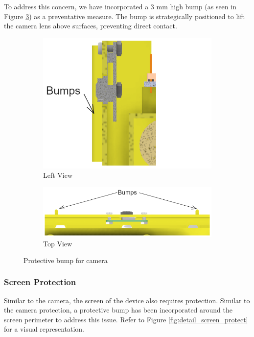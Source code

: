 To address this concern, we have incorporated a 3 mm high bump (as seen in Figure \ref{fig:detail_camera_protect}) as a preventative measure. The bump is strategically positioned to lift the camera lens above surfaces, preventing direct contact.

\begin{figure}[!ht]
    \centering
    \begin{subfigure}[c]{0.47\textwidth}
        \begin{minipage}{\textwidth}
            \centering
            \includegraphics[height=4 cm]{texs/Part1/chapter4/image/d12.png}
        \end{minipage}
        \caption{Left View}
        \label{fig:detail_camera_left}
    \end{subfigure}
    \begin{subfigure}[c]{\textwidth}
        \begin{minipage}{\textwidth}
            \centering
            \includegraphics[width=0.75\linewidth]{texs/Part1/chapter4/image/d13.png}
        \end{minipage}
        \caption{Top View}
        \label{fig:detail_camera_top}
    \end{subfigure}
    \caption{Protective bump for camera}
    \label{fig:detail_camera_protect}
\end{figure}

\subsubsection{Screen Protection}
Similar to the camera, the screen of the device also requires protection. Similar to the camera protection, a protective bump has been incorporated around the screen perimeter to address this issue. Refer to Figure \ref{fig:detail_screen_protect} for a visual representation.

